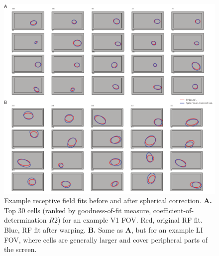 \begin{figure}[t!]
\includegraphics[width=\textwidth]{figures/supplemental/fig_s8_spherical_correction_examples/fig_s8_spherical_correction_examples.pdf}
    \vspace{.1in}
    \caption[Example RFs after spherical correction]{Example receptive field fits before and after spherical correction.
    \textbf{A.} Top 30 cells (ranked by goodness-of-fit measure, coefficient-of-determination $R2$) for an example V1 FOV. Red, original RF fit. Blue, RF fit after warping. 
    \textbf{B.} Same as \textbf{A}, but for an example LI FOV, where cells are generally larger and cover peripheral parts of the screen.
    \label{supfig:spherical_correction_examples}}
\end{figure}


